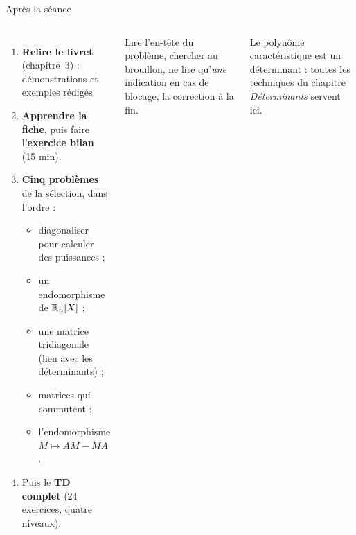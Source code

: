 \documentclass[aspectratio=169,10pt]{beamer}
\begin{document}
\begin{frame}{Après la séance}
\begin{columns}[T]
\begin{enumerate}
\item \textbf{Relire le livret} (chapitre~3) : démonstrations et exemples rédigés.
\item \textbf{Apprendre la fiche}, puis faire l'\textbf{exercice bilan} (15 min).
\item \textbf{Cinq problèmes} de la sélection, dans l'ordre :
\begin{itemize}\small
\item diagonaliser pour calculer des puissances ;
\item un endomorphisme de $\mathbb{R}_n[X]$ ;
\item une matrice tridiagonale (lien avec les déterminants) ;
\item matrices qui commutent ;
\item l'endomorphisme $M\mapsto AM-MA$.
\end{itemize}
\item Puis le \textbf{TD complet} (24 exercices, quatre niveaux).
\end{enumerate}
\begin{ASTU}
Lire l'en-tête du problème, chercher au brouillon, ne lire qu'\emph{une} indication en cas de blocage, la correction à la fin.
\end{ASTU}
\begin{ASTU}
Le polynôme caractéristique est un déterminant : toutes les techniques du chapitre \emph{Déterminants} servent ici.
\end{ASTU}
\end{columns}
\end{frame}
\end{document}
